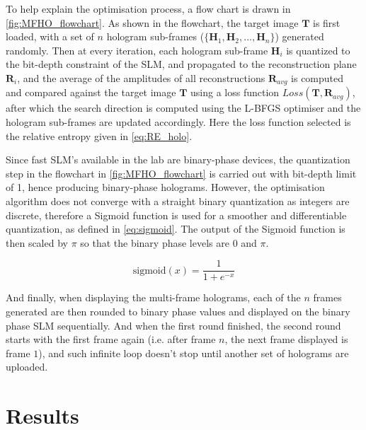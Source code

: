 	To help explain the optimisation process, a flow chart is drawn in \cref{fig:MFHO_flowchart}. As shown in the flowchart, the target image $\textbf{T}$ is first loaded, with a set of $n$ hologram sub-frames ($\{\textbf{H}_1, \textbf{H}_2, ..., \textbf{H}_n\}$) generated randomly. Then at every iteration, each hologram sub-frame $\textbf{H}_i$ is quantized to the bit-depth constraint of the SLM, and propagated to the reconstruction plane $\textbf{R}_i$, and the average of the amplitudes of all reconstructions $\textbf{R}_{avg}$ is computed and compared against the target image $\textbf{T}$ using a loss function $Loss(\textbf{T}, \textbf{R}_{avg})$, after which the search direction is computed using the L-BFGS optimiser and the hologram sub-frames are updated accordingly. Here the loss function selected is the relative entropy\cite{Kullback1951} given in \cref{eq:RE_holo}.


	Since fast SLM's available in the lab are binary-phase devices, the quantization step in the flowchart in \cref{fig:MFHO_flowchart} is carried out with bit-depth limit of 1, hence producing binary-phase holograms. However, the optimisation algorithm does not converge with a straight binary quantization as integers are discrete, therefore a Sigmoid function \cite{Bacaer2011} is used for a smoother and differentiable quantization, as defined in \cref{eq:sigmoid}. The output of the Sigmoid function is then scaled by $\pi$ so that the binary phase levels are $0$ and $\pi$.

	\begin{equation}
		\mathrm{sigmoid}(x)=\frac{1}{1+e^{-x}}
		\label{eq:sigmoid}
	\end{equation}

	And finally, when displaying the multi-frame holograms, each of the $n$ frames generated are then rounded to binary phase values and displayed on the binary phase SLM sequentially. And when the first round finished, the second round starts with the first frame again (i.e. after frame $n$, the next frame displayed is frame $1$), and such infinite loop doesn't stop until another set of holograms are uploaded.

\section{Results}

